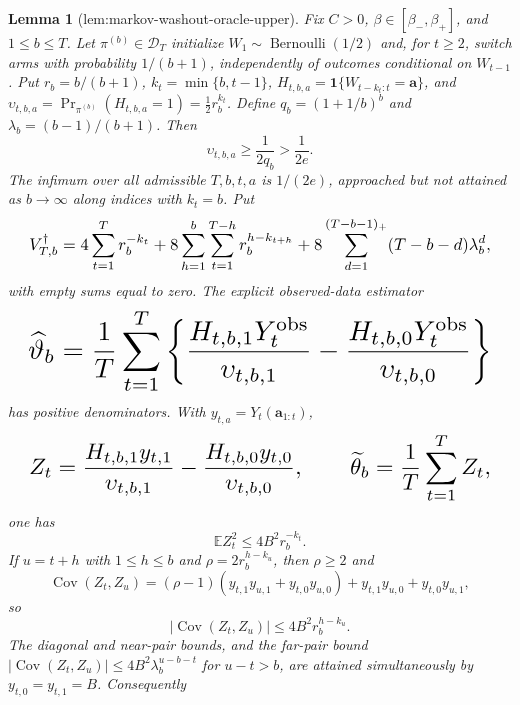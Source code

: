 \documentclass{article}
\newtheorem{lemma}{Lemma}
\begin{document}
\begin{lemma}[lem:markov-washout-oracle-upper]\label{lem:markov-washout-oracle-upper}
Fix \(C>0\), \(\beta\in[\beta_-,\beta_+]\), and \(1\le b\le T\). Let \(\pi^{(b)}\in\mathcal D_T\) initialize \(W_1\sim\operatorname{Bernoulli}(1/2)\) and, for \(t\ge2\), switch arms with probability \(1/(b+1)\), independently of outcomes conditional on \(W_{t-1}\). Put \(r_b=b/(b+1)\), \(k_t=\min\{b,t-1\}\), \(H_{t,b,a}=\mathbf1\{W_{t-k_t:t}=\mathbf a\}\), and \(\upsilon_{t,b,a}=\Pr_{\pi^{(b)}}(H_{t,b,a}=1)=\tfrac12r_b^{k_t}\). Define \(q_b=(1+1/b)^b\) and \(\lambda_b=(b-1)/(b+1)\). Then \[\upsilon_{t,b,a}\ge\frac{1}{2q_b}>\frac{1}{2e}.\] The infimum over all admissible \(T,b,t,a\) is \(1/(2e)\), approached but not attained as \(b\to\infty\) along indices with \(k_t=b\). Put \[
\makebox[\linewidth][c]{\resizebox{0.98\linewidth}{!}{\leavevmode\par\noindent \makebox[\linewidth][c]{\resizebox{0.98\linewidth}{!}{\(\displaystyle \displaystyle V_{T,b}^{\dagger}=4\sum_{t=1}^T r_b^{-k_t}+8\sum_{h=1}^b\sum_{t=1}^{T-h}r_b^{h-k_{t+h}}+8\sum_{d=1}^{(T-b-1)_+}(T-b-d)\lambda_b^d,\)}}\par\noindent}}
\] with empty sums equal to zero. The explicit observed-data estimator \[
\makebox[\linewidth][c]{\resizebox{0.98\linewidth}{!}{\leavevmode\par\noindent \makebox[\linewidth][c]{\resizebox{0.98\linewidth}{!}{\(\displaystyle \displaystyle \widehat\vartheta_b=\frac1T\sum_{t=1}^T\left\{\frac{H_{t,b,1}Y_t^{\mathrm{obs}}}{\upsilon_{t,b,1}}-\frac{H_{t,b,0}Y_t^{\mathrm{obs}}}{\upsilon_{t,b,0}}\right\}\)}}\par\noindent}}
\] has positive denominators. With \(y_{t,a}=Y_t(\mathbf a_{1:t})\), \[
\makebox[\linewidth][c]{\resizebox{0.98\linewidth}{!}{\leavevmode\par\noindent \makebox[\linewidth][c]{\resizebox{0.98\linewidth}{!}{\(\displaystyle \displaystyle Z_t=\frac{H_{t,b,1}y_{t,1}}{\upsilon_{t,b,1}}-\frac{H_{t,b,0}y_{t,0}}{\upsilon_{t,b,0}},\qquad \widetilde\theta_b=\frac1T\sum_{t=1}^TZ_t,\)}}\par\noindent}}
\] one has \[\mathbb EZ_t^2\le4B^2r_b^{-k_t}.\] If \(u=t+h\) with \(1\le h\le b\) and \(\rho=2r_b^{h-k_u}\), then \(\rho\ge2\) and \[\operatorname{Cov}(Z_t,Z_u)=(\rho-1)(y_{t,1}y_{u,1}+y_{t,0}y_{u,0})+y_{t,1}y_{u,0}+y_{t,0}y_{u,1},\] so \[|\operatorname{Cov}(Z_t,Z_u)|\le4B^2r_b^{h-k_u}.\] The diagonal and near-pair bounds, and the far-pair bound \(|\operatorname{Cov}(Z_t,Z_u)|\le4B^2\lambda_b^{u-b-t}\) for \(u-t>b\), are attained simultaneously by \(y_{t,0}=y_{t,1}=B\). Consequently \[
\]
\end{lemma}
\end{document}

